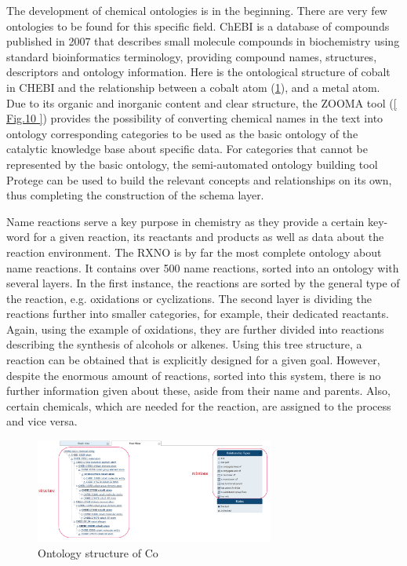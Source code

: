 \documentclass[%
 aip,
 jmp,%
 amsmath,amssymb,
 reprint,%
]{revtex4-2}
\begin{document}
The development of chemical ontologies is in the beginning. There are very few ontologies to be found 
for this specific field. ChEBI\cite{degtyarenko2007chebi} is a database of compounds published in 2007 that 
describes small molecule compounds in biochemistry using standard bioinformatics terminology, providing compound names, structures, 
descriptors and ontology information. Here is the ontological structure of cobalt in CHEBI and the relationship between a cobalt atom (\ref{ Fig.9 }), 
and a metal atom. Due to its organic and inorganic content and clear structure, the ZOOMA tool (\ref{ Fig.10 }) provides the possibility 
of converting chemical names in the text into ontology corresponding categories to be used as the basic ontology of the catalytic 
knowledge base about specific data. For categories that cannot be represented by the basic ontology, the semi-automated ontology 
building tool Protege\cite{musen2015protege} can be used to build the relevant concepts and relationships on its own, thus completing the construction of the 
schema layer.

Name reactions serve a key purpose in chemistry as they provide a certain key-word for a given reaction, 
its reactants and products as well as data about the reaction environment. The RXNO\cite{pachl2020overview} is by far the most 
complete ontology about name reactions. It contains over 500 name reactions, sorted into an ontology with
several layers. In the first instance, the reactions are sorted by the general type of the reaction, e.g.
oxidations or cyclizations. The second layer is dividing the reactions further into smaller categories,
for example, their dedicated reactants. Again, using the example of oxidations, they are further divided
into reactions describing the synthesis of alcohols or alkenes. Using this tree structure,
a reaction can be obtained that is explicitly designed for a given goal. However, despite the enormous
amount of reactions, sorted into this system, there is no further information given about these, aside
from their name and parents. Also, certain chemicals, which are needed for the reaction, are assigned
to the process and vice versa.


\begin{figure}[htbp]
 \centering
 \includegraphics[width=0.7\textwidth]{figure/9.png}
 \caption{ Ontology structure of Co }
 \label{ Fig.9 }
\end{figure}
\end{document}
